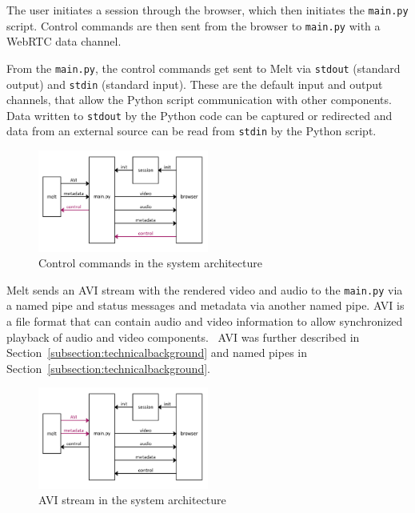 \documentclass[12pt,a4paper]{article}
\begin{document}
The user initiates a session through the browser, which then initiates the \texttt{main.py} script.
Control commands are then sent from the browser to \texttt{main.py} with a WebRTC data channel.

From the \texttt{main.py}, the control commands get sent to Melt via \texttt{stdout} (standard output) and \texttt{stdin} (standard input). These are the default input and output channels, that allow the Python script communication with other components.
Data written to \texttt{stdout} by the Python code can be captured or redirected and data from an external source can be read from \texttt{stdin} by the Python script. \cite{python}

\begin{figure}[H]
	\centering
	\includegraphics[width=0.5\textwidth]{IM_control.png}
	\caption{Control commands in the system architecture}
	
\end{figure}


Melt sends an AVI stream with the rendered video and audio to the \texttt{main.py} via a named pipe and status messages and metadata via another named pipe.
AVI is a file format that can contain audio and video information to allow synchronized playback of audio and video components.~\cite{avi} AVI was further described in Section~\ref{subsection:technicalbackground} and named pipes in Section~\ref{subsection:technicalbackground}.

\begin{figure}[H]
	\centering
	\includegraphics[width=0.5\textwidth]{IM_avi.png}
	\caption{AVI stream in the system architecture}
\end{figure}
\end{document}
